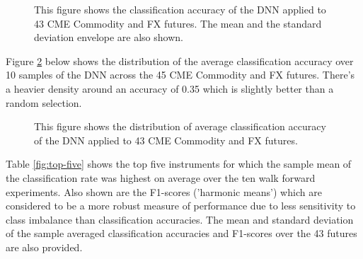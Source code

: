\documentclass{article}
\begin{document}
\begin{figure}[H]
	\caption{This figure shows the classification accuracy of the DNN applied to 43 CME Commodity and FX futures. The mean and the standard deviation envelope are also shown.}
	\label{fig:classification}
\end{figure}

Figure \ref{fig:classification_hist} below shows the distribution of the average classification accuracy over 10 samples of the DNN across the 45 CME Commodity and FX futures. There's a heavier density around an accuracy of 0.35 which is slightly better than a random selection.


\begin{figure}[H]
	\caption{This figure shows the distribution of average classification accuracy of the DNN applied to 43 CME Commodity and FX futures.}
	\label{fig:classification_hist}
\end{figure}


\vspace{10pt}
Table \ref{fig:top-five} shows the top five instruments for which the sample mean of the classification rate was highest on average over the ten walk forward experiments. Also shown are the F1-scores ('harmonic means') which are considered to be a more robust measure of performance due to less sensitivity to class imbalance than classification accuracies. The mean and standard deviation of the sample averaged classification accuracies and F1-scores over the 43 futures are also provided.
\end{document}

